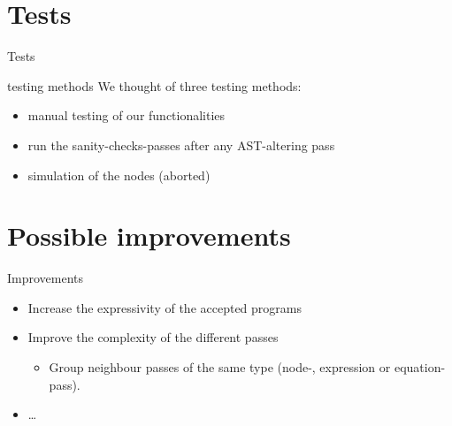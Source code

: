 \documentclass{beamer}
\begin{document}
\section{Tests}
\begin{frame}{Tests}
    \begin{block}{testing methods}
        We thought of three testing methods:
        \begin{itemize}
            \item manual testing of our functionalities
            \item run the sanity-checks-passes after any AST-altering pass
            \item simulation of the nodes (aborted)
        \end{itemize}
    \end{block}
\end{frame}

\section{Possible improvements}
\begin{frame}{Improvements}
    \begin{itemize}
        \item Increase the expressivity of the accepted programs
        \item Improve the complexity of the different passes
        \begin{itemize}
            \item Group neighbour passes of the same type (node-, expression or
            equation-pass).
        \end{itemize}
        \item \dots{}
    \end{itemize}
\end{frame}
\end{document}
